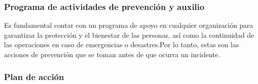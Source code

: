     \subsubsection{Programa de actividades de prevención y auxilio}
    
    Es fundamental contar con un programa de apoyo en cualquier organización para garantizar la protección y el bienestar de las personas, así como la continuidad de las operaciones en caso de emergencias o desastres.Por lo tanto, estas son las acciones de prevención que se toman antes de que ocurra un incidente.
    
    \subsubsection{Plan de acción}
    
